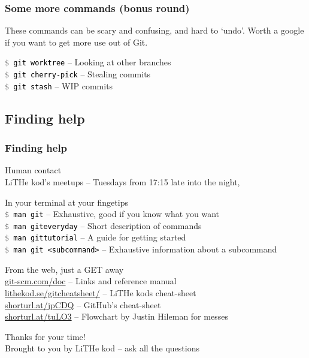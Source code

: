\documentclass{beamer}
\newcommand{\command}[1]{\colorbox{black!90!white!10!}{\vphantom{Ep}\texttt{\textcolor{gray}{\$} \textcolor{black}{#1}}}}
\begin{document}
\begin{frame}[fragile]
  \frametitle{Some more commands (bonus round)}
  These commands can be scary and confusing, and hard to `undo'. Worth a google if you
  want to get more use out of Git.
  \vspace{1em}
  
  \command{git worktree} -- Looking at other branches \\
  \command{git cherry-pick} -- Stealing commits \\
  \command{git stash} -- WIP commits \\
    
\end{frame}

\subsection{Finding help}

\begin{frame}[fragile]
  \frametitle{Finding help}

  Human contact \\
  \hspace{1em} LiTHe kod's meetups -- Tuesdays from 17:15 late into the night, \\
  \vspace{1em}
  \pause

  In your terminal at your fingetips \\
  \hspace{1em} \command{man git} -- Exhaustive, good if you know what you want \\
  \hspace{1em} \command{man giteveryday} -- Short description of commands \\
  \hspace{1em} \command{man gittutorial} -- A guide for getting started \\
  \hspace{1em} \command{man git <subcommand>} -- Exhaustive information about a subcommand\\
  \vspace{1em}
  \pause

  From the web, just a GET away \\
  \hspace{1em} \url{git-scm.com/doc} -- Links and reference manual \\
  \hspace{1em} \url{lithekod.se/gitcheatsheet/} -- LiTHe kods cheat-sheet \\
  \hspace{1em} \url{shorturl.at/jpCDQ} -- GitHub's cheat-sheet \\
  \hspace{1em} \url{shorturl.at/tuLO3} -- Flowchart by Justin Hileman for messes\\

\end{frame}

\begin{frame}[fragile]
  \begin{center}
    \Huge Thanks for your time! \\[0.75em]
    \small Brought to you by LiTHe kod -- ask all the questions 
  \end{center}
\end{frame}
\end{document}

